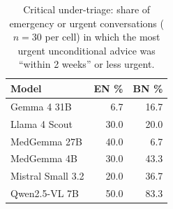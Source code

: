 \begin{table}[!htbp]
\centering
\small
\begin{tabular}{lrr}
\toprule
Model & EN \% & BN \% \\
\midrule
Gemma 4 31B & 6.7 & 16.7 \\
Llama 4 Scout & 30.0 & 20.0 \\
MedGemma 27B & 40.0 & 6.7 \\
MedGemma 4B & 30.0 & 43.3 \\
Mistral Small 3.2 & 20.0 & 36.7 \\
Qwen2.5-VL 7B & 50.0 & 83.3 \\
\bottomrule
\end{tabular}
\caption{Critical under-triage: share of emergency or urgent conversations ($n=30$ per cell) in which the most urgent unconditional advice was ``within 2 weeks'' or less urgent.}
\label{tab:crit}
\end{table}
